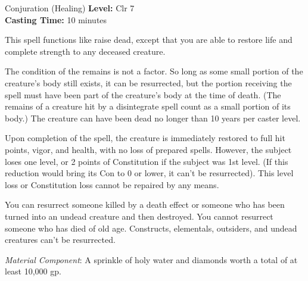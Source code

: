 {Conjuration (Healing)}
{
	\textbf{Level:}
	Clr 7\\
	\textbf{Casting Time:}
	10 minutes\\
}
{
	This spell functions like raise dead, except that you are able to restore life and complete strength to any deceased creature.

	The condition of the remains is not a factor. So long as some small portion of the creature's body still exists, it can be resurrected, but the portion receiving the spell must have been part of the creature's body at the time of death. (The remains of a creature hit by a disintegrate spell count as a small portion of its body.) The creature can have been dead no longer than 10 years per caster level.

	Upon completion of the spell, the creature is immediately restored to full hit points, vigor, and health, with no loss of prepared spells. However, the subject loses one level, or 2 points of Constitution if the subject was 1st level. (If this reduction would bring its Con to 0 or lower, it can't be resurrected). This level loss or Constitution loss cannot be repaired by any means.

	You can resurrect someone killed by a death effect or someone who has been turned into an undead creature and then destroyed. You cannot resurrect someone who has died of old age. Constructs, elementals, outsiders, and undead creatures can't be resurrected.

	\textit{Material Component}:
	A sprinkle of holy water and diamonds worth a total of at least 10,000 gp.

}
